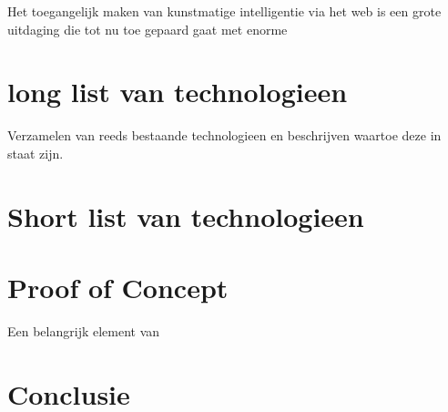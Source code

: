 Het toegangelijk maken van kunstmatige intelligentie via het web is een grote uitdaging die tot nu toe gepaard gaat met enorme 

\section{long list van technologieen}

Verzamelen van reeds bestaande technologieen en beschrijven waartoe deze in staat zijn.

\section{Short list van technologieen}

\section{Proof of Concept}

Een belangrijk element van

\section{Conclusie}


